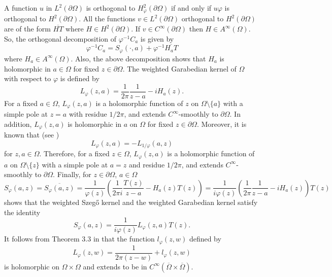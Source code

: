 \documentclass[11pt, reqno]{amsart}
\numberwithin{equation}{section}
\begin{document}
A function $u$ in $L^2(\partial\Omega)$ is orthogonal to $H^2_{\varphi}(\partial\Omega)$ if and only if $u\varphi$ is orthogonal to $H^2(\partial\Omega)$. All the functions $v\in L^2(\partial\Omega)$ orthogonal to $H^2(\partial\Omega)$ are of the form $\overline{HT}$ where $H\in H^2(\partial\Omega)$. If $v\in C^{\infty}(\partial\Omega)$ then $H\in A^{\infty}(\Omega)$. So, the orthogonal decomposition of $\varphi^{-1}C_a$ is given by
\begin{equation}
\varphi^{-1}C_a = S_{\varphi}(\cdot,a) + \varphi^{-1} \overline{H_aT}
\end{equation}
where $H_a\in A^{\infty}(\Omega)$. Also, the above decomposition shows that $H_a$ is holomorphic in $a\in\Omega$ for fixed $z\in\partial\Omega$. The weighted Garabedian kernel of $\Omega$ with respect to $\varphi$ is defined by
\begin{equation}
L_{\varphi}(z,a) = \frac{1}{2\pi}\frac{1}{z-a} - i H_a(z).
\end{equation}
For a fixed $a\in\Omega$, $L_{\varphi}(z,a)$ is a holomorphic function of $z$ on $\Omega\setminus\{a\}$ with a simple pole at $z=a$ with residue $1/2\pi$, and extends $C^{\infty}$-smoothly to $\partial\Omega$. In addition, $L_{\varphi}(z,a)$ is holomorphic in $a$ on $\Omega$ for fixed $z\in \partial\Omega$. Moreover, it is known that (see \cite{Nehari})
\begin{equation}
L_{\varphi}(z,a) = - L_{1/\varphi}(a,z)
\end{equation}
for $z,a\in\Omega$. Therefore, for a fixed $z\in\Omega$, $L_{\varphi}(z,a)$ is a holomorphic function of $a$ on $\Omega\setminus\{z\}$ with a simple pole at $a=z$ and residue ${1}/2\pi$, and extends $C^{\infty}$-smoothly to $\partial\Omega$. Finally, for $z \in \partial \Omega$, $a \in \Omega$
\[
S_{\varphi}(a,z) = \overline{S_{\varphi}(a,z)} 
=
\frac{1}{\varphi(z)}\left(\frac{1}{2\pi i}\frac{T(z)}{z-a}-H_a(z) T(z)\right)
=
\frac{1}{i\varphi(z)}\left(\frac{1}{2\pi}\frac{1}{z-a}-iH_a(z)\right)T(z)
\]
shows that the weighted Szeg\H{o} kernel and the weighted Garabedian kernel satisfy the identity
\begin{equation}
S_{\varphi}(a,z) = \frac{1}{i\varphi(z)} L_{\varphi}(z,a) T(z).
\end{equation}
It follows from Theorem $3.3$ in \cite{JV} that the function $l_{\varphi}(z,w)$ defined by 
\[
L_{\varphi}(z,w) = \frac{1}{2\pi(z-w)} + l_{\varphi}(z,w)
\]
is holomorphic on $\Omega\times\Omega$ and extends to be in $C^{\infty} (\overline{\Omega}\times\overline{\Omega})$.
\end{document}
